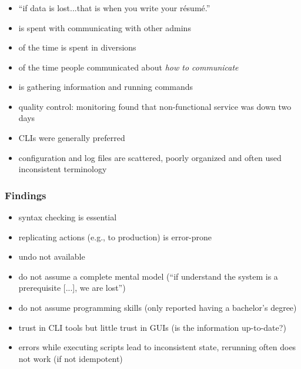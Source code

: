 \begin{frame}
	\frametitle{\citet{haber2007design}}

	\begin{itemize}[<+-| alert@+>]
	\item ``if data is lost...that is when you write your résumé.''
	\item {} is spent with communicating with other admins
	\item {} of the time is spent in diversions~\cite{barrett2004field}
	\item {} of the time people communicated about \emph{how to communicate}~\cite{barrett2004field}
	\item {} is gathering information and running commands
	\item quality control: monitoring found that non-functional service was down two days
	\item CLIs were generally preferred
	\item configuration and log files are scattered, poorly organized and often used inconsistent terminology
	\end{itemize}
\end{frame}


\begin{frame}
	\frametitle{Findings \cite{barrett2004field}}

	\begin{itemize}[<+-| alert@+>]
	\item syntax checking is essential
	\item replicating actions (e.g., to production) is error-prone
	\item undo not available
	\item do not assume a complete mental model (``if understand the system is a prerequisite [...], we are lost'')
	\item do not assume programming skills (only  reported having a bachelor's degree)
	\item trust in CLI tools but little trust in GUIs (is the information up-to-date?)
	\item errors while executing scripts lead to inconsistent state, rerunning often does not work (if not idempotent)
	\end{itemize}
\end{frame}

